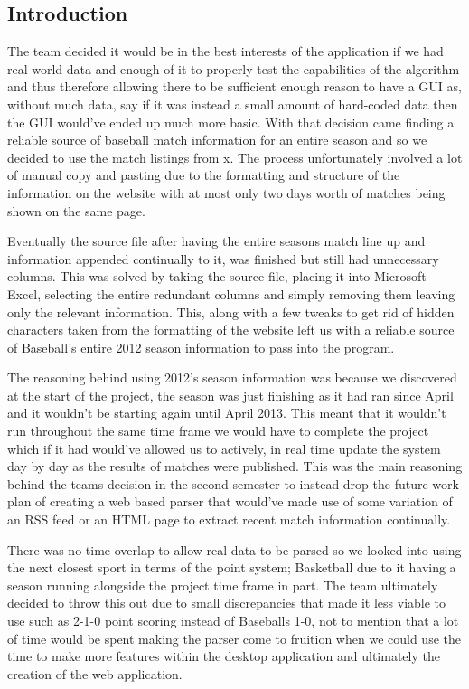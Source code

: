 \subsection{Introduction}

The team decided it would be in the best interests of the application
if we had real world data and enough of it to properly test the
capabilities of the algorithm and thus therefore allowing there to be
sufficient enough reason to have a GUI as, without much data, say if
it was instead a small amount of hard-coded data then the GUI would've
ended up much more basic. With that decision came finding a reliable
source of baseball match information for an entire season and so we
decided to use the match listings from x. The process unfortunately
involved a lot of manual copy and pasting due to the formatting and
structure of the information on the website with at most only two days
worth of matches being shown on the same page.

Eventually the source file after having the entire seasons match line
up and information appended continually to it, was finished but still
had unnecessary columns. This was solved by taking the source file,
placing it into Microsoft Excel, selecting the entire redundant
columns and simply removing them leaving only the relevant
information. This, along with a few tweaks to get rid of hidden
characters taken from the formatting of the website left us with a
reliable source of Baseball's entire 2012 season information to pass
into the program. 

The reasoning behind using 2012's season information was because we
discovered at the start of the project, the season was just finishing
as it had ran since April and it wouldn't be starting again until
April 2013. This meant that it wouldn't run throughout the same time
frame we would have to complete the project which if it had would've
allowed us to actively, in real time update the system day by day as
the results of matches were published. This was the main reasoning
behind the teams decision in the second semester to instead drop the
future work plan of creating a web based parser that would've made use
of some variation of an RSS feed or an HTML page to extract recent
match information continually. 

There was no time overlap to allow real data to be parsed so we looked
into using the next closest sport in terms of the point system;
Basketball due to it having a season running alongside the project
time frame in part. The team ultimately decided to throw this out due
to small discrepancies that made it less viable to use such as 2-1-0
point scoring instead of Baseballs 1-0, not to mention that a lot of
time would be spent making the parser come to fruition when we could
use the time to make more features within the desktop application and
ultimately the creation of the web application. 

